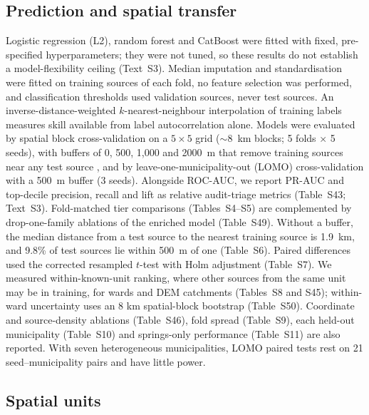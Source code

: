 \documentclass[preprint,12pt,authoryear]{elsarticle}
\begin{document}
\subsection{Prediction and spatial transfer}
Logistic regression (L2), random forest \citep{breiman2001random} and CatBoost \citep{prokhorenkova2018catboost} were fitted with fixed, pre-specified hyperparameters; they were not tuned, so these results do not establish a model-flexibility ceiling (Text~S3). Median imputation and standardisation were fitted on training sources of each fold, no feature selection was performed, and classification thresholds used validation sources, never test sources. An inverse-distance-weighted $k$-nearest-neighbour interpolation of training labels measures skill available from label autocorrelation alone. Models were evaluated by spatial block cross-validation on a $5 \times 5$ grid ($\sim$\SI{8}{\kilo\metre} blocks; 5 folds $\times$ 5 seeds), with buffers of 0, 500, 1,000 and \SI{2000}{\metre} that remove training sources near any test source \citep{roberts2017cross, valavi2019blockcv, ploton2020spatial}, and by leave-one-municipality-out (LOMO) cross-validation with a \SI{500}{\metre} buffer (3 seeds). Alongside ROC-AUC, we report PR-AUC and top-decile precision, recall and lift as relative audit-triage metrics (Table~S43; Text~S3). Fold-matched tier comparisons (Tables~S4--S5) are complemented by drop-one-family ablations of the enriched model (Table~S49). Without a buffer, the median distance from a test source to the nearest training source is \SI{1.9}{\kilo\metre}, and 9.8\% of test sources lie within \SI{500}{\metre} of one (Table~S6). Paired differences used the corrected resampled $t$-test \citep{nadeau2003inference, bouckaert2004evaluating} with Holm adjustment (Table~S7). We measured within-known-unit ranking, where other sources from the same unit may be in training, for wards and DEM catchments (Tables~S8 and S45); within-ward uncertainty uses an 8 km spatial-block bootstrap (Table~S50). Coordinate and source-density ablations (Table~S46), fold spread (Table~S9), each held-out municipality (Table~S10) and springs-only performance (Table~S11) are also reported. With seven heterogeneous municipalities, LOMO paired tests rest on 21 seed--municipality pairs and have little power.

\subsection{Spatial units}\label{sec:m-units}
\end{document}
